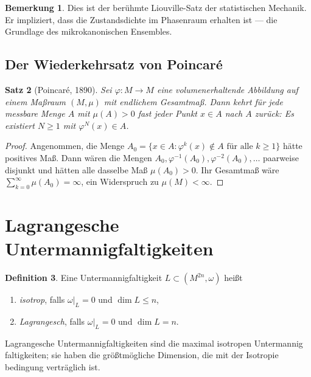 \documentclass[12pt,a4paper]{amsart}
\newtheorem{theorem}{Satz}[section]
\theoremstyle{definition}
\newtheorem{definition}[theorem]{Definition}
\newtheorem{bemerkung}[theorem]{Bemerkung}
\begin{document}
\begin{bemerkung}
Dies ist der berühmte Liouville-Satz der statistischen Mechanik.  Er impliziert,
dass die Zustandsdichte im Phasenraum erhalten ist --- die Grundlage des
mikrokanonischen Ensembles.
\end{bemerkung}

\subsection{Der Wiederkehrsatz von Poincar\'{e}}

\begin{theorem}[Poincar\'{e}, 1890]\label{thm:poincare}
Sei $\varphi: M \to M$ eine volumenerhaltende Abbildung auf einem Maßraum
$(M, \mu)$ mit endlichem Gesamtmaß.  Dann kehrt für jede messbare Menge
$A$ mit $\mu(A) > 0$ fast jeder Punkt $x \in A$ nach $A$ zurück: Es existiert
$N \geq 1$ mit $\varphi^N(x) \in A$.
\end{theorem}

\begin{proof}
Angenommen, die Menge $A_0 = \{x \in A : \varphi^k(x) \notin A \text{ für alle }
k \geq 1\}$ hätte positives Maß.  Dann wären die Mengen $A_0, \varphi^{-1}(A_0),
\varphi^{-2}(A_0), \ldots$ paarweise disjunkt und hätten alle dasselbe Maß
$\mu(A_0) > 0$.  Ihr Gesamtmaß wäre $\sum_{k=0}^\infty \mu(A_0) = \infty$,
ein Widerspruch zu $\mu(M) < \infty$.
\end{proof}

\section{Lagrangesche Untermannigfaltigkeiten}
\label{sec:lagrange}

\begin{definition}
Eine Untermannigfaltigkeit $L \subset (M^{2n}, \omega)$ heißt
\begin{enumerate}[label=(\roman*)]
  \item \emph{isotrop}, falls $\omega|_L = 0$ und $\dim L \leq n$,
  \item \emph{Lagrangesch}, falls $\omega|_L = 0$ und $\dim L = n$.
\end{enumerate}
\end{definition}

Lagrangesche Untermannigfaltigkeiten sind die maximal isotropen Untermannig\-
faltigkeiten; sie haben die größtmögliche Dimension, die mit der Isotropie\-
bedingung verträglich ist.
\end{document}
